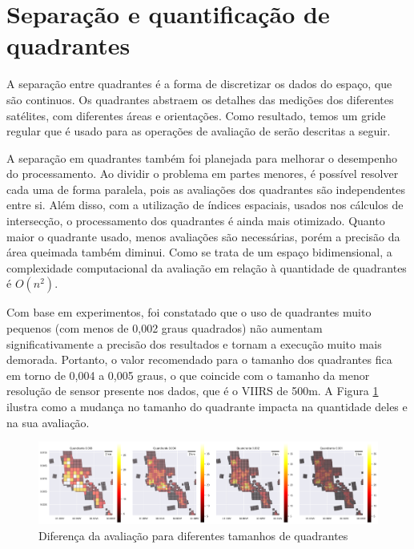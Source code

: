 \documentclass[cic,tc]{iiufrgs}
\begin{document}
\section{Separação e quantificação de quadrantes}

A separação entre quadrantes é a forma de discretizar os dados do espaço, que são continuos. Os quadrantes abstraem os detalhes das medições dos diferentes satélites, com diferentes áreas e orientações. Como resultado, temos um gride regular que é usado para as operações de avaliação de serão descritas a seguir. \par

A separação em quadrantes também foi planejada para melhorar o desempenho do processamento. Ao dividir o problema em partes menores, é possível resolver cada uma de forma paralela, pois as avaliações dos quadrantes são independentes entre si. Além disso, com a utilização de índices espaciais, usados nos cálculos de intersecção, o processamento dos quadrantes é ainda mais otimizado. Quanto maior o quadrante usado, menos avaliações são necessárias, porém a precisão da área queimada também diminui. Como se trata de um espaço bidimensional, a complexidade computacional da avaliação em relação à quantidade de quadrantes é $O(n^2)$. \par

Com base em experimentos, foi constatado que o uso de quadrantes muito pequenos (com menos de 0,002 graus quadrados) não aumentam significativamente a precisão dos resultados e tornam a execução muito mais demorada. Portanto, o valor recomendado para o tamanho dos quadrantes fica em torno de 0,004 a 0,005 graus, o que coincide com o tamanho da menor resolução de sensor presente nos dados, que é o VIIRS de 500m. A Figura \ref{fig:diferenca_entre_quadrantes} ilustra como a mudança no tamanho do quadrante impacta na quantidade deles e na sua avaliação. \par

\begin{figure}[H]
    \caption{Diferença da avaliação para diferentes tamanhos de quadrantes}
    \begin{center}
        \includegraphics[width=35em]{diferenca_entre_quadrantes}
    \end{center}
    \label{fig:diferenca_entre_quadrantes}
\end{figure}
\end{document}
